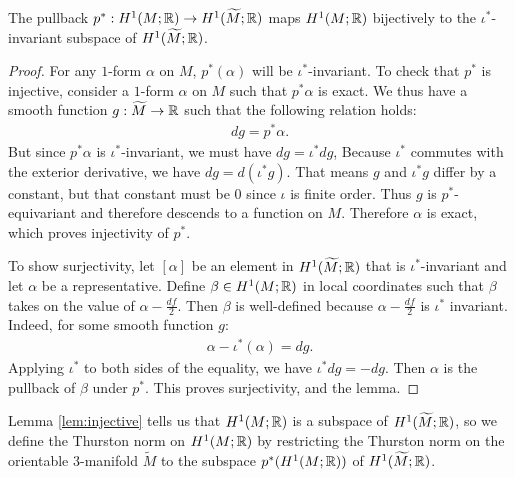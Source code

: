 \begin{lem}
  \label{lem:injective}
  The pullback $p^{\ast}:H^1(M;\mathbb{R})\rightarrow H^1(\widetilde{M};\mathbb{R})$ maps $H^1(M; \mathbb{R})$ bijectively to the $\iota^{\ast}$-invariant subspace of
  $H^1(\widetilde{M}; \mathbb{R})$.
\end{lem}
\begin{proof}
  For any $1$-form $\alpha$ on $M$, $p^{\ast}(\alpha)$ will be
  $\iota^{\ast}$-invariant. %
  To check that $p^\ast$ is injective, consider a $1$-form $\alpha$ on $M$ such that $p^{\ast}\alpha$
  is exact. We thus have a smooth function $g:\widetilde{M}\to\mathbb{R}$ such that the following relation holds:
    \begin{align*}
        dg = p^{\ast} \alpha.
    \end{align*}
    But since $p^{\ast}\alpha$ is $\iota^{\ast}$-invariant, we must have $dg = \iota^{\ast} dg$,
    Because $\iota^\ast$ commutes with the exterior derivative, we have $dg = d(\iota^{\ast}g)$. That means $g$
    and $\iota^{\ast}g$ differ by a constant, but that constant must be $0$ since $\iota$ is finite
    order. Thus $g$ is $p^*$-equivariant and therefore descends to a function on $M$. Therefore $\alpha$ is exact, which
    proves injectivity of $p^{\ast}$.

    To show surjectivity, let $[\alpha]$ be an element in
    $H^1(\widetilde{M}; \mathbb{R})$ that is $\iota^{\ast}$-invariant and let $\alpha$ be a representative.  Define $\beta\in H^1(M;\mathbb{R})$ in local coordinates such that $\beta$ takes on the value of $\alpha-\frac{df}{2}$.  Then $\beta$ is well-defined because $\alpha-\frac{df}{2}$ is $\iota^\ast$ invariant.  Indeed, for some smooth function $g$:
    \begin{align*}
        \alpha - \iota^{\ast}(\alpha) = dg.
    \end{align*}
    Applying $\iota^\ast$ to both sides of the equality, we have $\iota^{\ast}dg = -dg$. Then $\alpha$ is the pullback of $\beta$ under %
    $p^{\ast}$. This proves surjectivity, and the lemma.
\end{proof}

Lemma \ref{lem:injective} tells us that $H^1(M; \mathbb{R})$ is a subspace of $H^1(\widetilde{M}; \mathbb{R})$, so we define the Thurston norm on $H^1(M; \mathbb{R})$ by restricting the Thurston norm on the orientable 3-manifold $\widetilde{M}$ to the subspace $p^*(H^1(M;\mathbb{R}))$ of $H^1(\widetilde{M};\mathbb{R})$.

